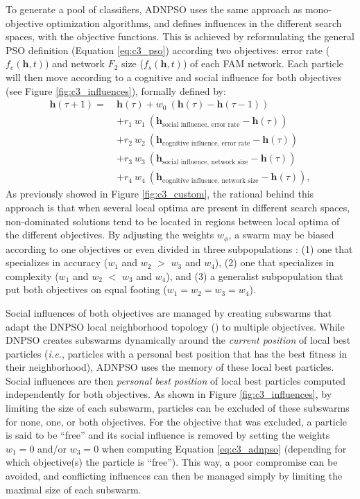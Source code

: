 To generate a pool of classifiers, ADNPSO uses the same approach as mono-objective optimization algorithms, and defines influences in the different search spaces, with the objective functions.
This is achieved by reformulating the general PSO definition (Equation \ref{eq:c3_pso}) according two objectives: error rate ($f_e(\mathbf{h},t)$) and network $F_2$ size ($f_s(\mathbf{h},t)$) of each FAM network.
Each particle will then move according to a cognitive and social influence for both objectives (see Figure \ref{fig:c3_influences}), formally defined by:
\begin{equation}
	\begin{split}
		\textbf{h}\left(\tau+1\right) = \  
		  & \textbf{h}(\tau) + w_0\ ( \textbf{h}(\tau) - \textbf{h}(\tau-1) )\\
		    & + r_1\ w_1\
				    ( \textbf{h}_\text{social influence, error rate}    - 		
				    	\textbf{h}(\tau) )\\
				& + r_2\ w_2\ 
				    ( \textbf{h}_\text{cognitive influence, error rate} - 	
				    	\textbf{h}(\tau) )\\  				      
				& + r_3\ w_3\ 
				    ( \textbf{h}_\text{social influence, network size}    - 
				    	\textbf{h}(\tau) )\\
				& + r_4\ w_4\ 
				    ( \textbf{h}_\text{cognitive influence, network size} - 
				      \textbf{h}(\tau) ),
	\end{split}
	\label{eq:c3_adnpso}
\end{equation}
As previously showed in Figure \ref{fig:c3_custom}, the rational behind this approach is that when several local optima are present in different search spaces, non-dominated solutions tend to be located in regions between local optima of the different objectives.
By adjusting the weights $w_\phi$, a swarm may be biased according to one objectives or even divided in three subpopulations : (1) one that specializes in accuracy ($w_1$ and $w_2$ $>$ $w_3$ and $w_4$), (2) one that specializes in complexity ($w_1$ and $w_2$ $<$ $w_3$ and $w_4$), and (3) a generalist subpopulation that put both objectives on equal footing ($w_1=w_2=w_3=w_4$).

Social influences of both objectives are managed by creating subswarms that adapt the DNPSO local neighborhood topology (\cite{nickabadi08_1}) to multiple objectives.
While DNPSO creates subswarms dynamically around the \emph{current position} of local best particles (\emph{i.e.}, particles with a personal best position that has the best fitness in their neighborhood), ADNPSO uses the memory of these local best particles.
Social influences are then \emph{personal best position} of local best particles computed independently for both objectives.
As shown in Figure \ref{fig:c3_influences}, by limiting the size of each subswarm, particles can be excluded of these subswarms for none, one, or both objectives.
For the objective that was excluded, a particle is said to be ``free'' and its social influence is removed by setting the weights $w_1=0$ and/or $w_3=0$ when computing Equation \ref{eq:c3_adnpso} (depending for which objective(s) the particle is ``free'').
This way, a poor compromise can be avoided, and conflicting influences can then be managed simply by limiting the maximal size of each subswarm.

